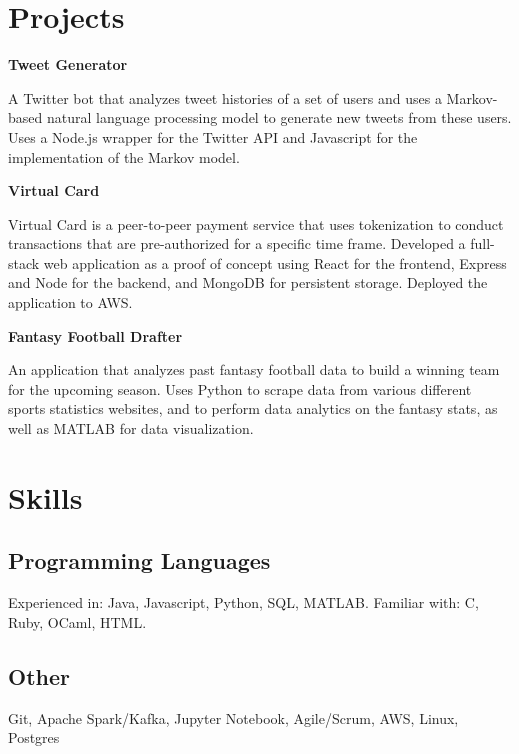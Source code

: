 \documentclass[11pt,a4paper,sans]{moderncv}        %
\begin{document}
{\vspace*{-0.1in}
\section{Projects}






\large{
\textbf{Tweet Generator}
}

\vspace{1pt}

A Twitter bot that analyzes tweet histories of a set of users and uses a Markov-based natural language processing model to generate new tweets from these users. Uses a Node.js wrapper for the Twitter API and Javascript for the implementation of the Markov model.\newline

\vspace{0.05in}

\large{
\textbf{Virtual Card}
}

Virtual Card is a peer-to-peer payment service that uses tokenization to conduct transactions that are pre-authorized for a specific time frame. Developed a full-stack web application as a proof of concept using React for the frontend, Express and Node for the backend, and MongoDB for persistent storage. Deployed the application to AWS.\newline

\vspace{0.05in}

\large{
\textbf{Fantasy Football Drafter}
}

An application that analyzes past fantasy football data to build a winning team for the upcoming season. Uses Python to scrape data from various different sports statistics websites, and to perform data analytics on the fantasy stats, as well as MATLAB for data visualization. 


\section{Skills}

\subsection{Programming Languages} Experienced in: Java, Javascript, Python, SQL, MATLAB. Familiar with: C, Ruby, OCaml, HTML.

\subsection{Other} Git, Apache Spark/Kafka, Jupyter Notebook, Agile/Scrum, AWS, Linux, Postgres

\vspace{1pt}
}




\end{document}
